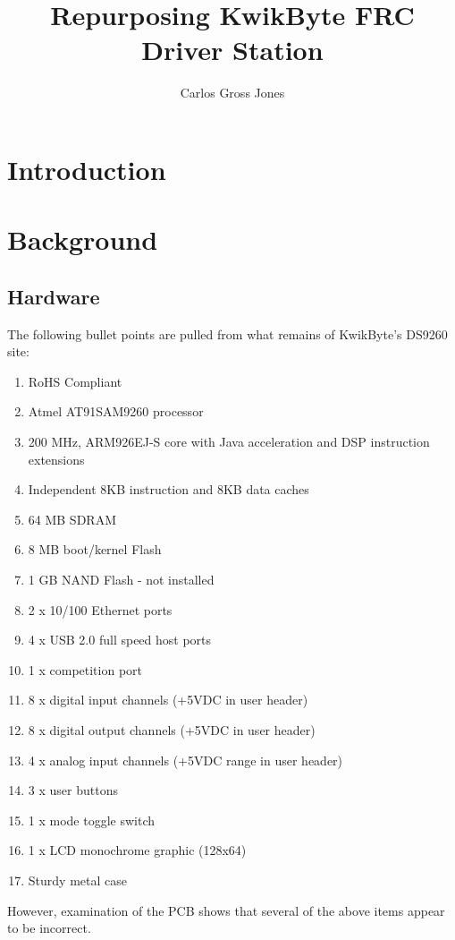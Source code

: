 \documentclass[]{article}
\title{Repurposing KwikByte FRC Driver Station}
\author{Carlos Gross Jones}
\begin{document}
\maketitle

\begin{abstract}

\end{abstract}

\section{Introduction}
\section{Background}
\subsection{Hardware}
\par The following bullet points are pulled from what remains of KwikByte's DS9260 site:
\begin{enumerate}
	\item RoHS Compliant
	\item Atmel AT91SAM9260 processor
	\item 200 MHz, ARM926EJ-S core with Java acceleration and DSP instruction extensions
	\item Independent 8KB instruction and 8KB data caches
	\item 64 MB SDRAM
	\item 8 MB boot/kernel Flash
	\item 1 GB NAND Flash - not installed
	\item 2 x 10/100 Ethernet ports
	\item 4 x USB 2.0 full speed host ports
	\item 1 x competition port
	\item 8 x digital input channels (+5VDC in user header)
	\item 8 x digital output channels (+5VDC in user header)
	\item 4 x analog input channels (+5VDC range in user header)
	\item 3 x user buttons
	\item 1 x mode toggle switch
	\item 1 x LCD monochrome graphic (128x64)
	\item Sturdy metal case
\end{enumerate}
However, examination of the PCB shows that several of the above items appear to be incorrect. 
\end{document}
